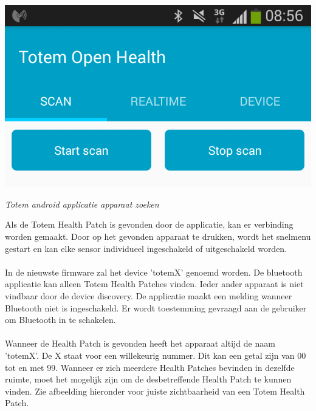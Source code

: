 \documentclass[conference]{IEEEtran}
\begin{document}
\begin{center}
    \includegraphics[scale=0.4]{apk1}
    \begin{minipage}{0.6\textwidth}
    \footnotesize
    \emph{Totem android applicatie apparaat zoeken}
    \end{minipage}
\end{center}

Als de Totem Health Patch is gevonden door de applicatie, kan er verbinding worden gemaakt. Door op het gevonden apparaat te drukken, wordt het snelmenu gestart en kan elke sensor individueel ingeschakeld of uitgeschakeld worden. \\\\In de nieuwste firmware zal het device 'totemX' genoemd worden. De bluetooth applicatie kan alleen Totem Health Patches vinden. Ieder ander apparaat is niet vindbaar door de device discovery. De applicatie maakt een melding wanneer Bluetooth niet is ingeschakeld. Er wordt toestemming gevraagd aan de gebruiker om Bluetooth in te schakelen. \\\\Wanneer de Health Patch is gevonden heeft het apparaat altijd de naam 'totemX'. De X staat voor een willekeurig nummer. Dit kan een getal zijn van 00 tot en met 99. Wanneer er zich meerdere Health Patches bevinden in dezelfde ruimte, moet het mogelijk zijn om de desbetreffende Health Patch te kunnen vinden. Zie afbeelding hieronder voor juiste zichtbaarheid van een Totem Health Patch. 
\end{document}
